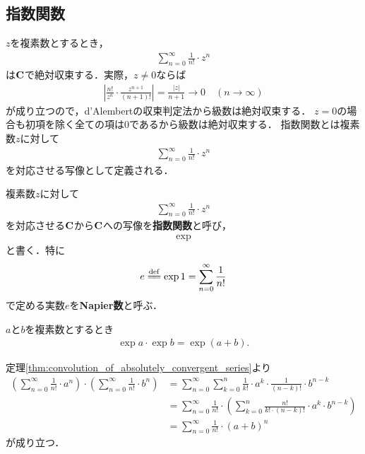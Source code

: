 \subsection{指数関数}
	
	$z$を複素数とするとき，
	\begin{align}
		\sum_{n=0}^\infty \frac{1}{n!} \cdot z^n
	\end{align}
	は$\mathbf{C}$で絶対収束する．実際，$z \neq 0$ならば
	\begin{align}
		\left|\frac{n!}{z^n} \cdot \frac{z^{n+1}}{(n+1)!}\right|
		= \frac{|z|}{n+1}
		\longrightarrow 0\quad (n \longrightarrow \infty)
	\end{align}
	が成り立つので，d'Alembertの収束判定法から級数は絶対収束する．
	$z=0$の場合も初項を除く全ての項は$0$であるから級数は絶対収束する．
	指数関数とは複素数$z$に対して
	\begin{align}
		\sum_{n = 0}^\infty \frac{1}{n!} \cdot z^n
	\end{align}
	を対応させる写像として定義される．
	
	\begin{screen}
		\begin{dfn}[指数関数]
			複素数$z$に対して
			\begin{align}
				\sum_{n=0}^\infty \frac{1}{n!} \cdot z^n
			\end{align}
			を対応させる$\mathbf{C}$から$\mathbf{C}$への写像を{\bf 指数関数}と呼び，
			\begin{align}
				\exp
			\end{align}
			と書く．特に
			\begin{align}
				e \defeq \exp{1} = \sum_{n=0}^\infty \frac{1}{n!}
			\end{align}
			で定める実数$e$を{\bf Napier数}と呼ぶ．
		\end{dfn}
	\end{screen}
	
	\begin{screen}
		\begin{thm}[指数法則]\label{thm:law_of_exponentiation_for_exponential_function}
			$a$と$b$を複素数とするとき
			\begin{align}
				\exp{a} \cdot \exp{b} = \exp{(a + b)}.
			\end{align}
		\end{thm}
	\end{screen}
	
	\begin{sketch}
		定理\ref{thm:convolution_of_absolutely_convergent_series}より
		\begin{align}
			\left(\sum_{n=0}^\infty \frac{1}{n!} \cdot a^n\right) \cdot \left(\sum_{n=0}^\infty \frac{1}{n!} \cdot b^n\right)
			&= \sum_{n=0}^\infty \sum_{k=0}^n \frac{1}{k!} \cdot a^k \cdot \frac{1}{(n-k)!} \cdot b^{n-k} \\
			&= \sum_{n=0}^\infty \frac{1}{n!} \cdot \left( \sum_{k=0}^n \frac{n!}{k! \cdot (n-k)!} \cdot a^k \cdot b^{n-k} \right) \\
			&= \sum_{n=0}^\infty \frac{1}{n!} \cdot (a+b)^n
		\end{align}
		が成り立つ．
		\QED
	\end{sketch}
	
